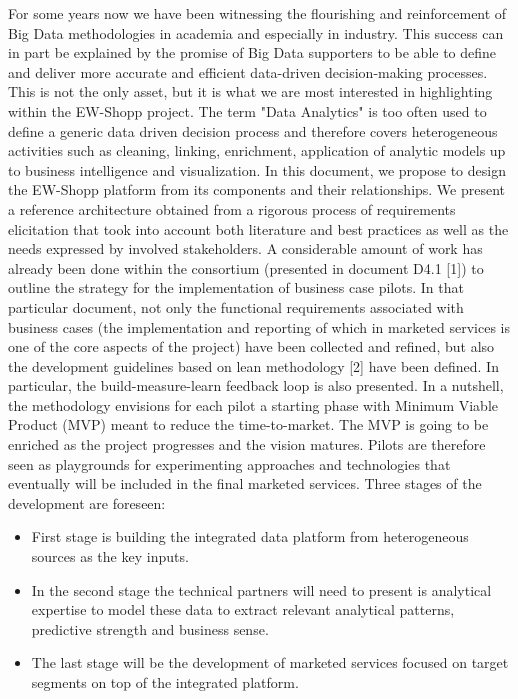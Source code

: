 For some years now we have been witnessing the flourishing and reinforcement of Big Data methodologies in academia and especially in industry. This success can in part be explained by the promise of Big Data supporters to be able to define and deliver more accurate and efficient data-driven decision-making processes. This is not the only asset, but it is what we are most interested in highlighting within the EW-Shopp project. 
The term "Data Analytics" is too often used to define a generic data driven decision process and therefore covers heterogeneous activities such as cleaning, linking, enrichment, application of analytic models up to business intelligence and visualization. In this document, we propose to design the EW-Shopp platform from its components and their relationships. We present a reference architecture obtained from a rigorous process of requirements elicitation that took into account both literature and best practices as well as the needs expressed by involved stakeholders. 
A considerable amount of work has already been done within the consortium (presented in document D4.1 [1]) to outline the strategy for the implementation of business case pilots. In that particular document, not only the functional requirements associated with business cases (the implementation and reporting of which in marketed services is one of the core aspects of the project) have been collected and refined, but also the development guidelines based on lean methodology [2] have been defined. In particular, the build-measure-learn feedback loop is also presented. In a nutshell, the methodology envisions for each pilot a starting phase with Minimum Viable Product (MVP) meant to reduce the time-to-market. The MVP is going to be enriched as the project progresses and the vision matures. Pilots are therefore seen as playgrounds for experimenting approaches and technologies that eventually will be included in the final marketed services. 
Three stages of the development are foreseen:
\begin{itemize}
    \item First stage is building the integrated data platform from heterogeneous sources as the key inputs. 
    \item In the second stage the technical partners will need to present is analytical expertise to model these data to extract relevant analytical patterns, predictive strength and business sense.
    \item The last stage will be the development of marketed services focused on target segments on top of the integrated platform.
\end{itemize}


